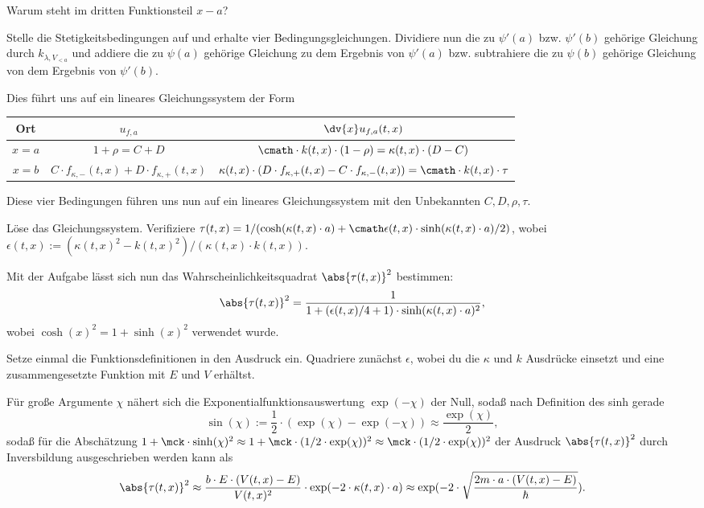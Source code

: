 \documentclass{subfiles}
\begin{document}
    \begin{Aufgabe}
        \nr{} Warum steht im dritten Funktionsteil $x-a$?

        \nr{} Stelle die Stetigkeitsbedingungen auf und erhalte vier Bedingungsgleichungen. Dividiere nun die zu $\psi'(a)$ bzw. $\psi'(b)$ gehörige Gleichung durch $k_{\lambda,V_{<a}}$ und addiere die zu $\psi(a)$ gehörige Gleichung zu dem Ergebnis von $\psi'(a)$ bzw. subtrahiere die zu $\psi(b)$ gehörige Gleichung von dem Ergebnis von $\psi'(b)$.
    \end{Aufgabe}
    Dies führt uns auf ein lineares Gleichungssystem der Form 
    \vspace{1cm}

    \begin{table}[H]
        \centering
        \begin{tabular}{c|c|c}
            Ort & $u_{f,a}$ & $\dv{x}u_{f,a}(t,x)$ \\
            \hline
            $x = a$ & $1+\rho = C + D$ & $\cmath\cdot k(t,x)\cdot (1-\rho) = \kappa(t,x)\cdot (D - C)$ \\
            $x = b$ & $C\cdot f_{\kappa,-}(t,x) + D\cdot f_{\kappa,+}(t,x)$ & $\kappa(t,x)\cdot(D\cdot f_{\kappa,+}(t,x) - C\cdot f_{\kappa,-}(t,x)) = \cmath\cdot k(t,x)\cdot \tau$ \\
        \end{tabular}
    \end{table}
    Diese vier Bedingungen führen uns nun auf ein lineares Gleichungssystem mit den Unbekannten $C,D,\rho,\tau$.
    \begin{Aufgabe}
        \nr{} Löse das Gleichungssystem. Verifiziere $\tau(t,x) = 1/(\cosh(\kappa(t,x)\cdot a) + \cmath\epsilon(t,x)\cdot\sinh(\kappa(t,x)\cdot a)/2)$, wobei $\epsilon(t,x):=(\kappa(t,x)^2-k(t,x)^2)/(\kappa(t,x)\cdot k(t,x))$.
    \end{Aufgabe}
    Mit der Aufgabe lässt sich nun das Wahrscheinlichkeitsquadrat $\abs{\tau(t,x)}^2$ bestimmen:
    \[\abs{\tau(t,x)}^2 = \frac{1}{1+(\epsilon(t,x)/4+1)\cdot\sinh(\kappa(t,x)\cdot a)^2},\]
    wobei $\cosh(x)^2 = 1+\sinh(x)^2$ verwendet wurde. 
    \begin{Aufgabe}
        \nr{} Setze einmal die Funktionsdefinitionen in den Ausdruck ein. Quadriere zunächst $\epsilon$, wobei du die $\kappa$ und $k$ Ausdrücke einsetzt und eine zusammengesetzte Funktion mit $E$ und $V$ erhältst. 
    \end{Aufgabe}
    Für große Argumente $\chi$ nähert sich die Exponentialfunktionsauswertung $\exp(-\chi)$ der Null, sodaß nach Definition des sinh gerade
    \[\sin(\chi) := \frac{1}{2}\cdot(\exp(\chi)-\exp(-\chi)) \approx \frac{\exp(\chi)}{2},\]
    sodaß für die Abschätzung $1+\mck\cdot\sinh(\chi)^2\approx 1+\mck\cdot(1/2\cdot\exp(\chi))^2\approx \mck\cdot(1/2\cdot\exp(\chi))^2$ der Ausdruck $\abs{\tau(t,x)}^2$ durch Inversbildung ausgeschrieben werden kann als
    \[\abs{\tau(t,x)}^2\approx \frac{b\cdot E\cdot(V(t,x) - E)}{V(t,x)^2}\cdot\exp(-2\cdot\kappa(t,x)\cdot a) \approx \exp(-2\cdot\sqrt{\frac{2m\cdot a\cdot(V(t,x) - E)}{\hbar}}).\]
\end{document}
